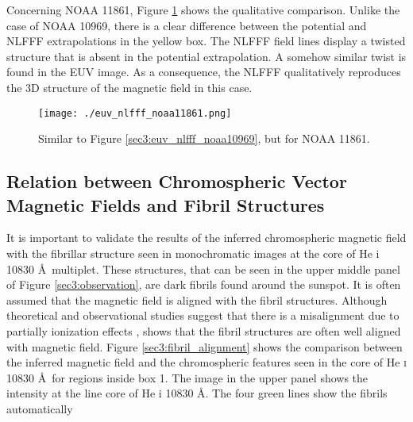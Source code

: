 \documentclass[manuscript]{aastex61}
\begin{document}
Concerning NOAA 11861, Figure \ref{sec3:euv_nlfff_noaa11861} shows the qualitative comparison.
Unlike the case of NOAA 10969, there is a clear difference between the potential and NLFFF 
extrapolations in the yellow box. The NLFFF field lines display a twisted structure that
is absent in the potential extrapolation. A somehow similar twist is found in the 
EUV image. As a consequence, the NLFFF qualitatively reproduces the 3D structure of the
magnetic field in this case.
  \begin{figure}
\texttt{[image: ./euv\_nlfff\_noaa11861.png]}
\caption{Similar to Figure \ref{sec3:euv_nlfff_noaa10969}, but for NOAA 11861.}
\label{sec3:euv_nlfff_noaa11861}
\end{figure}

\subsection{Relation between Chromospheric Vector Magnetic Fields and Fibril
Structures
\label{sec3:fibril}}
It is important to validate the results of the inferred chromospheric magnetic field with the
fibrillar structure seen in monochromatic images at the core of He {\sc i} 10830 \AA\ multiplet.
These structures, that can be seen in the upper middle panel of Figure \ref{sec3:observation}, are
dark fibrils found around the sunspot. It is often assumed that the magnetic field 
is aligned with the fibril structures.
Although theoretical and observational studies suggest that there is a misalignment 
due to partially ionization effects \citep{2011A&A...527L...8D, 2016ApJ...831L...1M,2017A&A...599A.133A},  
\cite{2013ApJ...768..111S} shows that the fibril structures are often well aligned with magnetic
field. 
Figure \ref{sec3:fibril_alignment} shows the comparison between the inferred 
magnetic field and the chromospheric features seen in the core of He \textsc{i} 10830 \AA\
for regions inside box 1. The image in the upper panel shows the intensity at the line core of
He {\sc i} 10830 \AA. The four green lines show the fibrils automatically
\end{document}
